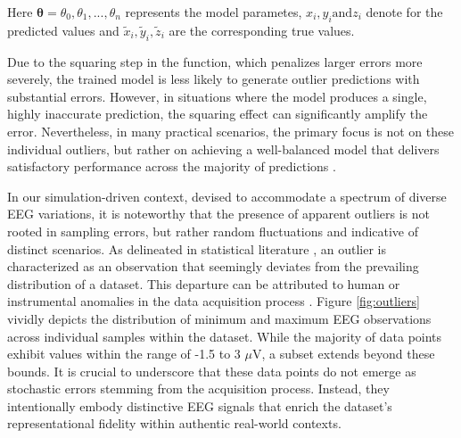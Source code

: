 \documentclass[a4paper, UKenglish, 11pt]{uiomaster}
\begin{document}
Here $\boldsymbol{\theta} = \theta_0, \theta_1, ..., \theta_n$ represents the model parametes, $x_i, y_i \text{and} z_i$ denote for the predicted values and $\tilde{x}_i, \tilde{y}_i, \tilde{z}_i$ are the corresponding true values.

Due to the squaring step in the function, which penalizes larger errors more severely, the trained model is less likely to generate outlier predictions with substantial errors. However, in situations where the model produces a single, highly inaccurate prediction, the squaring effect can significantly amplify the error. Nevertheless, in many practical scenarios, the primary focus is not on these individual outliers, but rather on achieving a well-balanced model that delivers satisfactory performance across the majority of predictions \cite{builtin-ml-loss-functions}.

In our simulation-driven context, devised to accommodate a spectrum of diverse EEG variations, it is noteworthy that the presence of apparent outliers is not rooted in sampling errors, but rather random fluctuations and indicative of distinct scenarios. As delineated in statistical literature \cite{barnett1994outliers}, an outlier is characterized as an observation that seemingly deviates from the prevailing distribution of a dataset. This departure can be attributed to human or instrumental anomalies in the data acquisition process \cite{zhang2015outlier}. Figure \ref{fig:outliers} vividly depicts the distribution of minimum and maximum EEG observations across individual samples within the dataset. While the majority of data points exhibit values within the range of -1.5 to 3 $\mu$V, a subset extends beyond these bounds. It is crucial to underscore that these data points do not emerge as stochastic errors stemming from the acquisition process. Instead, they intentionally embody distinctive EEG signals that enrich the dataset's representational fidelity within authentic real-world contexts.
\end{document}
